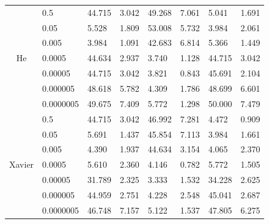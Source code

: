 \begin{table}[H]
\begin{tabular}{cl|llllll|}
\multicolumn{1}{|c|}{\multirow{7}{*}{He}} &
    0.5 &
    44.715 &
    \multicolumn{1}{l|}{3.042} &
    49.268 &
    \multicolumn{1}{l|}{7.061} &
    5.041 &
    1.691 \\
\multicolumn{1}{|c|}{} &
    0.05 &
    5.528 &
    \multicolumn{1}{l|}{1.809} &
    53.008 &
    \multicolumn{1}{l|}{5.732} &
    3.984 &
    2.061 \\
\multicolumn{1}{|c|}{} &
    0.005 &
    3.984 &
    \multicolumn{1}{l|}{1.091} &
    42.683 &
    \multicolumn{1}{l|}{6.814} &
    5.366 &
    1.449 \\
\multicolumn{1}{|c|}{} &
    0.0005 &
    44.634 &
    \multicolumn{1}{l|}{2.937} &
    3.740 &
    \multicolumn{1}{l|}{1.128} &
    44.715 &
    3.042 \\
\multicolumn{1}{|c|}{} &
    0.00005 &
    44.715 &
    \multicolumn{1}{l|}{3.042} &
    3.821 &
    \multicolumn{1}{r|}{0.843} &
    45.691 &
    2.104 \\
\multicolumn{1}{|c|}{} &
    0.000005 &
    48.618 &
    \multicolumn{1}{l|}{5.782} &
    4.309 &
    \multicolumn{1}{r|}{1.786} &
    48.699 &
    6.601 \\
\multicolumn{1}{|c|}{} &
    0.0000005 &
    49.675 &
    \multicolumn{1}{l|}{7.409} &
    5.772 &
    \multicolumn{1}{r|}{1.298} &
    50.000 &
    7.479 \\ \hline
\multicolumn{1}{|c|}{\multirow{7}{*}{Xavier}} &
    0.5 &
    44.715 &
    \multicolumn{1}{l|}{3.042} &
    46.992 &
    \multicolumn{1}{l|}{7.281} &
    4.472 &
    \multicolumn{1}{r|}{0.909} \\
\multicolumn{1}{|c|}{} &
    0.05 &
    5.691 &
    \multicolumn{1}{l|}{1.437} &
    45.854 &
    \multicolumn{1}{l|}{7.113} &
    3.984 &
    1.661 \\
\multicolumn{1}{|c|}{} &
    0.005 &
    4.390 &
    \multicolumn{1}{l|}{1.937} &
    44.634 &
    \multicolumn{1}{l|}{3.154} &
    4.065 &
    2.370 \\
\multicolumn{1}{|c|}{} &
    0.0005 &
    5.610 &
    \multicolumn{1}{l|}{2.360} &
    4.146 &
    \multicolumn{1}{r|}{0.782} &
    5.772 &
    1.505 \\
\multicolumn{1}{|c|}{} &
    0.00005 &
    31.789 &
    \multicolumn{1}{l|}{2.325} &
    3.333 &
    \multicolumn{1}{r|}{1.532} &
    34.228 &
    2.625 \\
\multicolumn{1}{|c|}{} &
    0.000005 &
    44.959 &
    \multicolumn{1}{l|}{2.751} &
    4.228 &
    \multicolumn{1}{l|}{2.548} &
    45.041 &
    2.687 \\
\multicolumn{1}{|c|}{} &
    0.0000005 &
    46.748 &
    \multicolumn{1}{l|}{7.157} &
    5.122 &
    \multicolumn{1}{l|}{1.537} &
    47.805 &
    6.275 \\ \hline
\end{tabular}
\label{table:alexnetsinhard}
\end{table}


